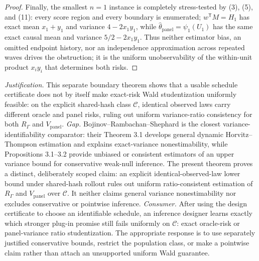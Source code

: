 \documentclass{article}
\begin{document}
\begin{proof}
Finally, the smallest \(n=1\) instance is completely stress-tested by (3), (5), and (11): every score region and every boundary is enumerated; \(w^{\mathsf T}M=H_1\) has exact mean \(x_1+y_1\) and variance \(4-2x_1y_1\), while \(\widehat\theta_{\mathrm{panel}}=\psi_1(U_1)\) has the same exact causal mean and variance \(5/2-2x_1y_1\).  Thus neither estimator bias, an omitted endpoint history, nor an independence approximation across repeated waves drives the obstruction; it is the uniform unobservability of the within-unit product \(x_i y_i\) that determines both risks.
\end{proof}
\par\smallskip\noindent \textit{Justification.} This separate boundary theorem shows that a usable schedule certificate does not by itself make exact-risk Wald studentization uniformly feasible: on the explicit shared-hash class \(\mathcal C\), identical observed laws carry different oracle and panel risks, ruling out uniform variance-ratio consistency for both \(R_\Gamma\) and \(V_{\mathrm{panel}}\). \textit{Gap.} Bojinov--Rambachan--Shephard is the closest variance-identifiability comparator: their Theorem 3.1 develops general dynamic Horvitz--Thompson estimation and explains exact-variance nonestimability, while Propositions 3.1--3.2 provide unbiased or consistent estimators of an upper variance bound for conservative weak-null inference. The present theorem proves a distinct, deliberately scoped claim: an explicit identical-observed-law lower bound under shared-hash rollout rules out uniform ratio-consistent estimation of \(R_\Gamma\) and \(V_{\mathrm{panel}}\) over \(\mathcal C\). It neither claims general variance nonestimability nor excludes conservative or pointwise inference. \textit{Consumer.} After using the design certificate to choose an identifiable schedule, an inference designer learns exactly which stronger plug-in promise still fails uniformly on \(\mathcal C\): exact oracle-risk or panel-variance ratio studentization. The appropriate response is to use separately justified conservative bounds, restrict the population class, or make a pointwise claim rather than attach an unsupported uniform Wald guarantee.
\end{document}
